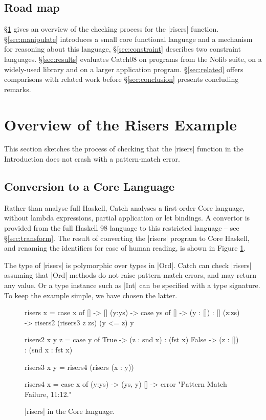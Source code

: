 \documentclass[preprint]{sigplanconf}
\begin{document}
\subsection{Road map}

\S\ref{sec:walkthrough} gives an overview of the checking process for the |risers| function. \S\ref{sec:manipulate} introduces a small core functional language and a mechanism for reasoning about this language, \S\ref{sec:constraint} describes two constraint languages. \S\ref{sec:results} evaluates Catch08 on programs from the Nofib suite, on a widely-used library and on a larger application program. \S\ref{sec:related} offers comparisons with related work before \S\ref{sec:conclusion} presents concluding remarks.

\section{Overview of the Risers Example}
\label{sec:walkthrough}

This section sketches the process of checking that the |risers| function in the Introduction does not crash with a pattern-match error.


\subsection{Conversion to a Core Language}

Rather than analyse full Haskell, Catch analyses a first-order Core language, without lambda expressions, partial application or let bindings. A convertor is provided from the full Haskell 98 language to this restricted language -- see \S\ref{sec:transform}. The result of converting the |risers| program to Core Haskell, and renaming the identifiers for ease of human reading, is shown in Figure \ref{fig:risers_core}.

The type of |risers| is polymorphic over types in |Ord|. Catch can check |risers| assuming that |Ord| methods do not raise pattern-match errors, and may return any value. Or a type instance such as |Int| can be specified with a type signature. To keep the example simple, we have chosen the latter.

\begin{figure}
\begin{code}
risers x = case x of
    [] -> []
    (y:ys) ->  case ys of
         [] -> (y : []) : []
         (z:zs) -> risers2 (risers3 z zs) (y <= z) y

risers2 x y z =  case y of
    True -> (z : snd x) : (fst x)
    False -> (z : []) : (snd x : fst x)

risers3 x y = risers4 (risers (x : y))

risers4 x = case x of
    (y:ys) -> (ys, y)
    [] -> error "Pattern Match Failure, 11:12."
\end{code}
\caption{|risers| in the Core language.}
\label{fig:risers_core}
\end{figure}
\end{document}
